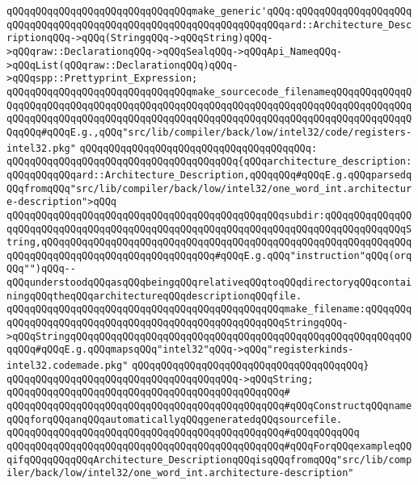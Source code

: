 \verb|qQQqqQQqqQQqqQQqqQQqqQQqqQQqqQQqmake_generic'qQQq:qQQqqQQqqQQqqQQqqQQqqQQqqQQqqQQqqQQqqQQqqQQqqQQqqQQqqQQqqQQqqQQqqQQqard::Architecture_DescriptionqQQq->qQQq(StringqQQq->qQQqString)qQQq->qQQqraw::DeclarationqQQq->qQQqSealqQQq->qQQqApi_NameqQQq->qQQqList(qQQqraw::DeclarationqQQq)qQQq->qQQqspp::Prettyprint_Expression;|\newline
\newline
\verb|qQQqqQQqqQQqqQQqqQQqqQQqqQQqqQQqmake_sourcecode_filenameqQQqqQQqqQQqqQQqqQQqqQQqqQQqqQQqqQQqqQQqqQQqqQQqqQQqqQQqqQQqqQQqqQQqqQQqqQQqqQQqqQQqqQQqqQQqqQQqqQQqqQQqqQQqqQQqqQQqqQQqqQQqqQQqqQQqqQQqqQQqqQQqqQQqqQQqqQQqqQQq#qQQqE.g.,qQQq"src/lib/compiler/back/low/intel32/code/registers-intel32.pkg"|\newline
\verb|qQQqqQQqqQQqqQQqqQQqqQQqqQQqqQQqqQQqqQQq:|\newline
\verb|qQQqqQQqqQQqqQQqqQQqqQQqqQQqqQQqqQQqqQQq{qQQqarchitecture_description:qQQqqQQqqQQqard::Architecture_Description,qQQqqQQq#qQQqE.g.qQQqparsedqQQqfromqQQq"src/lib/compiler/back/low/intel32/one_word_int.architecture-description">qQQq|\newline
\verb|qQQqqQQqqQQqqQQqqQQqqQQqqQQqqQQqqQQqqQQqqQQqqQQqsubdir:qQQqqQQqqQQqqQQqqQQqqQQqqQQqqQQqqQQqqQQqqQQqqQQqqQQqqQQqqQQqqQQqqQQqqQQqqQQqqQQqqQQqString,qQQqqQQqqQQqqQQqqQQqqQQqqQQqqQQqqQQqqQQqqQQqqQQqqQQqqQQqqQQqqQQqqQQqqQQqqQQqqQQqqQQqqQQqqQQqqQQqqQQq#qQQqE.g.qQQq"instruction"qQQq(orqQQq"")qQQq--qQQqunderstoodqQQqasqQQqbeingqQQqrelativeqQQqtoqQQqdirectoryqQQqcontainingqQQqtheqQQqarchitectureqQQqdescriptionqQQqfile.|\newline
\verb|qQQqqQQqqQQqqQQqqQQqqQQqqQQqqQQqqQQqqQQqqQQqqQQqmake_filename:qQQqqQQqqQQqqQQqqQQqqQQqqQQqqQQqqQQqqQQqqQQqqQQqqQQqqQQqStringqQQq->qQQqStringqQQqqQQqqQQqqQQqqQQqqQQqqQQqqQQqqQQqqQQqqQQqqQQqqQQqqQQqqQQqqQQq#qQQqE.g.qQQqmapsqQQq"intel32"qQQq->qQQq"registerkinds-intel32.codemade.pkg"|\newline
\verb|qQQqqQQqqQQqqQQqqQQqqQQqqQQqqQQqqQQqqQQq}|\newline
\verb|qQQqqQQqqQQqqQQqqQQqqQQqqQQqqQQqqQQqqQQq->qQQqString;|\newline
\verb|qQQqqQQqqQQqqQQqqQQqqQQqqQQqqQQqqQQqqQQqqQQqqQQq#|\newline
\verb|qQQqqQQqqQQqqQQqqQQqqQQqqQQqqQQqqQQqqQQqqQQqqQQq#qQQqConstructqQQqnameqQQqforqQQqanqQQqautomaticallyqQQqgeneratedqQQqsourcefile.|\newline
\verb|qQQqqQQqqQQqqQQqqQQqqQQqqQQqqQQqqQQqqQQqqQQqqQQq#qQQqqQQqqQQq|\newline
\verb|qQQqqQQqqQQqqQQqqQQqqQQqqQQqqQQqqQQqqQQqqQQqqQQq#qQQqForqQQqexampleqQQqifqQQqqQQqqQQqArchitecture_DescriptionqQQqisqQQqfromqQQq"src/lib/compiler/back/low/intel32/one_word_int.architecture-description"|\newline
